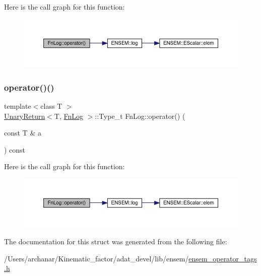 Here is the call graph for this function\+:
\nopagebreak
\begin{figure}[H]
\begin{center}
\leavevmode
\includegraphics[width=350pt]{d6/d29/structFnLog_a888c66c42f3d71caf35dd0d0cf80d6fb_cgraph}
\end{center}
\end{figure}
\mbox{\label{structFnLog_a888c66c42f3d71caf35dd0d0cf80d6fb}} 
\subsubsection{\texorpdfstring{operator()()}{operator()()}\hspace{0.1cm}{\footnotesize\ttfamily [2/2]}}
{\footnotesize\ttfamily template$<$class T $>$ \\
\mbox{\hyperlink{structUnaryReturn}{Unary\+Return}}$<$T, \mbox{\hyperlink{structFnLog}{Fn\+Log}} $>$\+::Type\+\_\+t Fn\+Log\+::operator() (\begin{DoxyParamCaption}\item[{const T \&}]{a }\end{DoxyParamCaption}) const\hspace{0.3cm}{\ttfamily [inline]}}

Here is the call graph for this function\+:
\nopagebreak
\begin{figure}[H]
\begin{center}
\leavevmode
\includegraphics[width=350pt]{d6/d29/structFnLog_a888c66c42f3d71caf35dd0d0cf80d6fb_cgraph}
\end{center}
\end{figure}


The documentation for this struct was generated from the following file\+:\begin{DoxyCompactItemize}
\item 
/\+Users/archanar/\+Kinematic\+\_\+factor/adat\+\_\+devel/lib/ensem/\mbox{\hyperlink{lib_2ensem_2ensem__operator__tags_8h}{ensem\+\_\+operator\+\_\+tags.\+h}}\end{DoxyCompactItemize}
